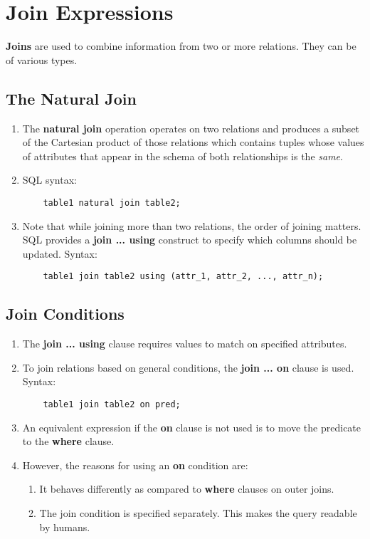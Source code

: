 \documentclass[journal,12pt,twocolumn]{IEEEtran}
\begin{document}
\section{Join Expressions}

\textbf{Joins} are used to combine information from two or more relations. They 
can be of various types.

\subsection{The Natural Join}
\begin{enumerate}
    \item The \textbf{natural join} operation operates on two relations and 
    produces a subset of the Cartesian product of those relations which contains 
    tuples whose values of attributes that appear in the schema of both 
    relationships is the \textit{same}.
    \item SQL syntax:
    \begin{lstlisting}
    table1 natural join table2;
    \end{lstlisting}
    \item Note that while joining more than two relations, the order of joining 
    matters. SQL provides a \textbf{join ... using} construct to specify which 
    columns should be updated. Syntax:
    \begin{lstlisting}
    table1 join table2 using (attr_1, attr_2, ..., attr_n);
    \end{lstlisting}
\end{enumerate}

\subsection{Join Conditions}
\begin{enumerate}
    \item The \textbf{join ... using} clause requires values to match on 
    specified attributes.
    \item To join relations based on general conditions, the 
    \textbf{join ... on} clause is used. Syntax:
    \begin{lstlisting}
    table1 join table2 on pred;
    \end{lstlisting}
    \item An equivalent expression if the \textbf{on} clause is not used is to 
    move the predicate to the \textbf{where} clause.
    \item However, the reasons for using an \textbf{on} condition are:
    \begin{enumerate}
        \item It behaves differently as compared to \textbf{where} clauses on 
        outer joins.
        \item The join condition is specified separately. This makes the query 
        readable by humans.
    \end{enumerate}
\end{enumerate}
\end{document}
